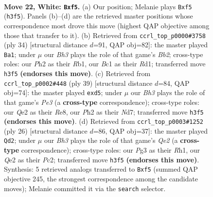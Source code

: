 \documentclass[11pt]{article}
\begin{document}
\clearpage

\begin{figure}[p]\centering
\begin{subfigure}{0.46\textwidth}\centering
\resizebox{\linewidth}{!}{%
\newchessgame
\chessboard[
  setfen={r1bq1r1k/2pn1pb1/1p1p1n2/3P1p1p/p1P5/P1N3PB/1PN1Q2P/1RB2RK1 w - - 0 22},
  showmover=false,
  pgfstyle=straightmove, color=movearrow, markmove={h3-f5}
]}
\caption{}
\end{subfigure}\hfill
\begin{subfigure}{0.46\textwidth}\centering
\resizebox{\linewidth}{!}{%
\newchessgame
\chessboard[
  setfen={r1r3k1/1p1bqpp1/p2b1n2/4n2p/1P1Np3/PB2P2P/1B1NQPP1/1R1R2K1 w - - 0 18},
  showmover=false,
  pgfstyle=straightmove, color=movearrow, markmove={b2-a1}
]}
\caption{}
\end{subfigure}
\\[4pt]
\begin{subfigure}{0.46\textwidth}\centering
\resizebox{\linewidth}{!}{%
\newchessgame
\chessboard[
  setfen={r3r1k1/1b1n1pp1/1q1bpn1p/p1pP4/8/PP2PN1P/1BQNBPP1/2RR2K1 b - - 0 20},
  showmover=false,
  pgfstyle=straightmove, color=movearrow, markmove={e6-d5}
]}
\caption{}
\end{subfigure}\hfill
\begin{subfigure}{0.46\textwidth}\centering
\resizebox{\linewidth}{!}{%
\newchessgame
\chessboard[
  setfen={1rbq1rk1/3nbp2/p2p1npp/1p2p3/4P2B/PNN2P2/1PP1Q1PP/1K1R1B1R w - - 2 14},
  showmover=false,
  pgfstyle=straightmove, color=movearrow, markmove={e2-d2}
]}
\caption{}
\end{subfigure}
\caption{\textbf{Move 22, White: \texttt{Bxf5}.} (a) Our position; Melanie plays \texttt{Bxf5} (\texttt{h3f5}). Panels (b)--(d) are the retrieved master positions whose correspondence most drove this move (highest QAP objective among those that transfer to it). (b) Retrieved from \texttt{ccrl\_top\_p0000\#3758} (ply 34) [structural distance $d$=91, QAP obj=82]: the master played \texttt{Ba1}; under $\mu$ our \emph{Bh3} plays the role of that game's \emph{Bb2}; cross-type roles: our \emph{P}h2 as their \emph{R}b1, our \emph{B}c1 as their \emph{R}d1; transferred move \texttt{h3f5} \textbf{(endorses this move)}. (c) Retrieved from \texttt{ccrl\_top\_p0002\#448} (ply 39) [structural distance $d$=84, QAP obj=74]: the master played \texttt{exd5}; under $\mu$ our \emph{Bh3} plays the role of that game's \emph{Pe3} (a \textbf{cross-type} correspondence); cross-type roles: our \emph{Q}e2 as their \emph{R}e8, our \emph{P}h2 as their \emph{N}d7; transferred move \texttt{h3f5} \textbf{(endorses this move)}. (d) Retrieved from \texttt{ccrl\_top\_p0003\#1252} (ply 26) [structural distance $d$=86, QAP obj=37]: the master played \texttt{Qd2}; under $\mu$ our \emph{Bh3} plays the role of that game's \emph{Qe2} (a \textbf{cross-type} correspondence); cross-type roles: our \emph{P}g3 as their \emph{R}h1, our \emph{Q}e2 as their \emph{P}c2; transferred move \texttt{h3f5} \textbf{(endorses this move)}. Synthesis: 5 retrieved analogs transferred to \texttt{Bxf5} (summed QAP objective 245, the strongest correspondence among the candidate moves); Melanie committed it via the \texttt{search} selector.}
\label{fig:thought-m42}
\end{figure}
\end{document}
